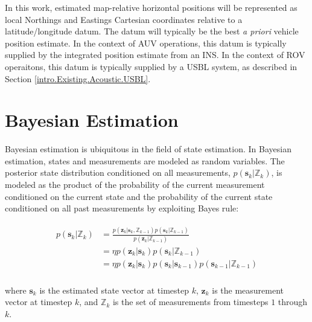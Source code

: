 In this work, estimated map-relative horizontal positions will be represented as local Northings and Eastings Cartesian coordinates relative to a latitude/longitude datum.  
The datum will typically be the best \emph{a priori} vehicle position estimate.
In the context of AUV operations, this datum is typically supplied by the integrated position estimate from an INS.
In the context of ROV operaitons, this datum is typically supplied by a USBL system, as described in Section \ref{intro.Existing.Acoustic.USBL}.

\section{Bayesian Estimation}
\label{framework.Bayesian}

Bayesian estimation is ubiquitous in the field of state estimation.  
In Bayesian estimation, states and measurements are modeled as random variables.
The posterior state distribution conditioned on all measurements, $p(\textbf{s}_k|\mathbb{Z}_k)$, is modeled as the product of the probability of the current measurement conditioned on the current state and the probability of the current state conditioned on all past measurements by exploiting Bayes rule:

\begin{align}
\begin{split}
p(\textbf{s}_k|\mathbb{Z}_k) &= \frac{p(\textbf{z}_k | \textbf{s}_k, \mathbb{Z}_{k-1})p(\textbf{s}_k | \mathbb{Z}_{k-1})}{p(\textbf{z}_k | \mathbb{Z}_{k-1})} \\
&= \eta p(\textbf{z}_k | \textbf{s}_k)p(\textbf{s}_k | \mathbb{Z}_{k-1}) \\
&= \eta p(\textbf{z}_k | \textbf{s}_k)p(\textbf{s}_k | \textbf{s}_{k-1})p(\textbf{s}_{k-1}|\mathbb{Z}_{k-1}) \\
\end{split}
\label{eq:Bayes}
\end{align}

\noindent where $\textbf{s}_k$ is the estimated state vector at timestep $k$, $\textbf{z}_k$ is the measurement vector at timestep $k$, and $\mathbb{Z}_k$ is the set of measurements from timesteps $1$ through $k$.  

